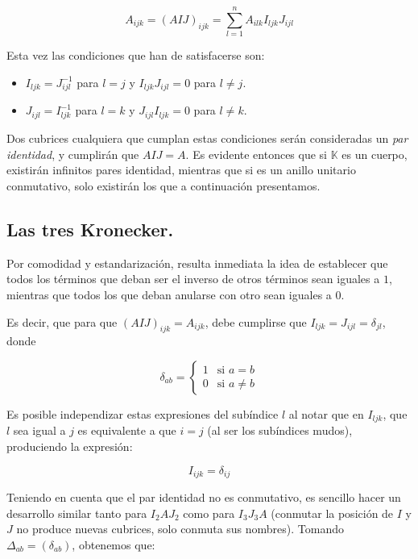 $$A_{ijk} = (AIJ)_{ijk} = \sum\limits_{l=1}^{n} A_{ilk} I_{ljk} J_{ijl}$$

Esta vez las condiciones que han de satisfacerse son:

\begin{itemize}
	\item $I_{ljk} = J_{ijl}^{-1}$ para $l = j$ y $I_{ljk} J_{ijl} = 0$ para $l \neq j$.
	\item $J_{ijl} = I_{ljk}^{-1}$ para $l = k$ y $J_{ijl} I_{ljk} = 0$ para $l \neq k$.
\end{itemize}

Dos cubrices cualquiera que cumplan estas condiciones serán consideradas un \textit{par identidad}, y cumplirán que $AIJ = A$. Es evidente entonces que si $\mathbb{K}$ es un cuerpo, existirán infinitos pares identidad, mientras que si es un anillo unitario conmutativo, solo existirán los que a continuación presentamos.

\subsection{Las tres Kronecker.}

Por comodidad y estandarización, resulta inmediata la idea de establecer que todos los términos que deban ser el inverso de otros términos sean iguales a $1$, mientras que todos los que deban anularse con otro sean iguales a $0$.

Es decir, que para que $(AIJ)_{ijk} = A_{ijk}$, debe cumplirse que $I_{ljk} = J_{ijl} = \delta_{jl}$, donde

\begin{equation}
	\delta_{ab} =
	\begin{cases}
		1 & \text{si } a = b \\
		0 & \text{si } a \neq b
	\end{cases}
\end{equation}

Es posible independizar estas expresiones del subíndice $l$ al notar que en $I_{ljk}$, que $l$ sea igual a $j$ es equivalente a que $i = j$ (al ser los subíndices mudos), produciendo la expresión:

$$I_{ijk} = \delta_{ij}$$

Teniendo en cuenta que el par identidad no es conmutativo, es sencillo hacer un desarrollo similar tanto para $I_2 A J_2$ como para $I_3 J_3 A$ (conmutar la posición de $I$ y $J$ no produce nuevas cubrices, solo conmuta sus nombres). Tomando $\Delta_{ab} = (\delta_{ab})$, obtenemos que: %

